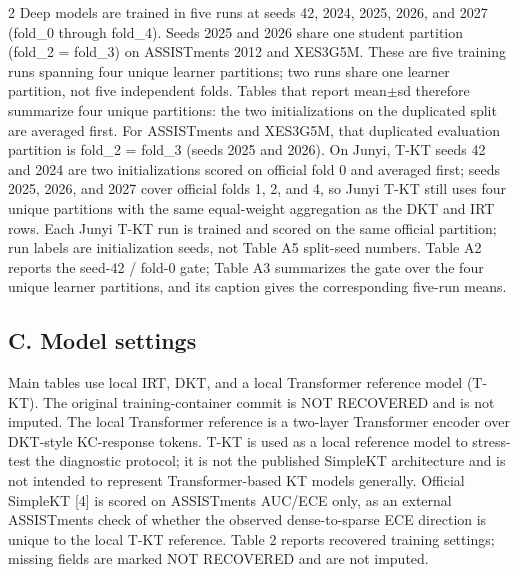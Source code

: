 \documentclass[10pt,a4paper]{article}
\begin{document}
\begin{multicols}{2}
Deep models are trained in five runs at seeds 42, 2024, 2025, 2026, and 2027 (fold\_0 through fold\_4). Seeds 2025 and 2026 share one student partition (fold\_2 = fold\_3) on ASSISTments 2012 and XES3G5M. These are five training runs spanning four unique learner partitions; two runs share one learner partition, not five independent folds. Tables that report mean$\pm$sd therefore summarize four unique partitions: the two initializations on the duplicated split are averaged first. For ASSISTments and XES3G5M, that duplicated evaluation partition is fold\_2 = fold\_3 (seeds 2025 and 2026). On Junyi, T-KT seeds 42 and 2024 are two initializations scored on official fold 0 and averaged first; seeds 2025, 2026, and 2027 cover official folds 1, 2, and 4, so Junyi T-KT still uses four unique partitions with the same equal-weight aggregation as the DKT and IRT rows. Each Junyi T-KT run is trained and scored on the same official partition; run labels are initialization seeds, not Table A5 split-seed numbers. Table A2 reports the seed-42 / fold-0 gate; Table A3 summarizes the gate over the four unique learner partitions, and its caption gives the corresponding five-run means.

\subsection*{C. Model settings}

Main tables use local IRT, DKT, and a local Transformer reference model (T-KT). The original training-container commit is NOT RECOVERED and is not imputed. The local Transformer reference is a two-layer Transformer encoder over DKT-style KC-response tokens. T-KT is used as a local reference model to stress-test the diagnostic protocol; it is not the published SimpleKT architecture and is not intended to represent Transformer-based KT models generally. Official SimpleKT [4] is scored on ASSISTments AUC/ECE only, as an external ASSISTments check of whether the observed dense-to-sparse ECE direction is unique to the local T-KT reference. Table 2 reports recovered training settings; missing fields are marked NOT RECOVERED and are not imputed.


\end{multicols}
\end{document}
